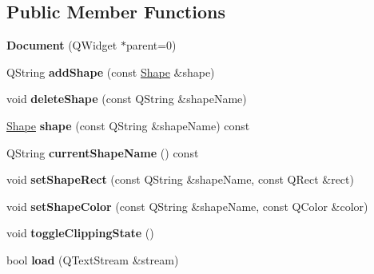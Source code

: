 \subsection*{Public Member Functions}
\begin{DoxyCompactItemize}
\item 
\hypertarget{class_document_ae799621237d1a405efac1f9a750af4ab}{{\bfseries Document} (Q\-Widget $\ast$parent=0)}\label{class_document_ae799621237d1a405efac1f9a750af4ab}

\item 
\hypertarget{class_document_a2aa3b90864f5e42b374be5cfce7e2ece}{Q\-String {\bfseries add\-Shape} (const \hyperlink{class_shape}{Shape} \&shape)}\label{class_document_a2aa3b90864f5e42b374be5cfce7e2ece}

\item 
\hypertarget{class_document_a217a73863c0b1a42141438d325422686}{void {\bfseries delete\-Shape} (const Q\-String \&shape\-Name)}\label{class_document_a217a73863c0b1a42141438d325422686}

\item 
\hypertarget{class_document_af78679d62d8bb06057253ba0fb811af3}{\hyperlink{class_shape}{Shape} {\bfseries shape} (const Q\-String \&shape\-Name) const }\label{class_document_af78679d62d8bb06057253ba0fb811af3}

\item 
\hypertarget{class_document_a4abe0b0c87fdfcb938d9317453cf1071}{Q\-String {\bfseries current\-Shape\-Name} () const }\label{class_document_a4abe0b0c87fdfcb938d9317453cf1071}

\item 
\hypertarget{class_document_a13027dbf32f362f3fe7f26d9d6f24e9c}{void {\bfseries set\-Shape\-Rect} (const Q\-String \&shape\-Name, const Q\-Rect \&rect)}\label{class_document_a13027dbf32f362f3fe7f26d9d6f24e9c}

\item 
\hypertarget{class_document_a1cbb635f0c6d6f5cdd4f8d470e117a91}{void {\bfseries set\-Shape\-Color} (const Q\-String \&shape\-Name, const Q\-Color \&color)}\label{class_document_a1cbb635f0c6d6f5cdd4f8d470e117a91}

\item 
\hypertarget{class_document_a5d0d6e357d4e388969fe9c9156aed8ba}{void {\bfseries toggle\-Clipping\-State} ()}\label{class_document_a5d0d6e357d4e388969fe9c9156aed8ba}

\item 
\hypertarget{class_document_a6dee418357af9ad2319d619ace4aefb0}{bool {\bfseries load} (Q\-Text\-Stream \&stream)}\label{class_document_a6dee418357af9ad2319d619ace4aefb0}


\end{DoxyCompactItemize}
